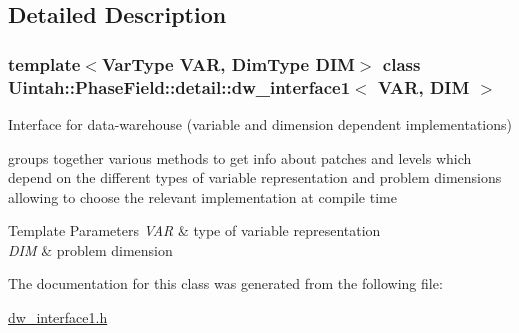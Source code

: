 \subsection{Detailed Description}
\subsubsection*{template$<$Var\+Type V\+AR, Dim\+Type D\+IM$>$\newline
class Uintah\+::\+Phase\+Field\+::detail\+::dw\+\_\+interface1$<$ V\+A\+R, D\+I\+M $>$}

Interface for data-\/warehouse (variable and dimension dependent implementations) 

groups together various methods to get info about patches and levels which depend on the different types of variable representation and problem dimensions allowing to choose the relevant implementation at compile time


\begin{DoxyTemplParams}{Template Parameters}
{\em V\+AR} & type of variable representation \\
\hline
{\em D\+IM} & problem dimension \\
\hline
\end{DoxyTemplParams}


The documentation for this class was generated from the following file\+:\begin{DoxyCompactItemize}
\item 
\hyperlink{dw__interface1_8h}{dw\+\_\+interface1.\+h}\end{DoxyCompactItemize}
